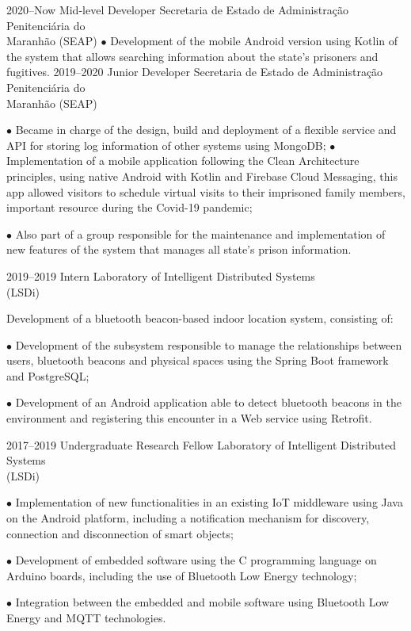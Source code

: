 \documentclass[]{../document-class/twentysecondcv}
\begin{document}
\begin{twenty}
	\twentyitem
		{2020--Now}
		{Mid-level Developer}
		{Secretaria de Estado de Administração Penitenciária do \\\hspace*{\fill}Maranhão (SEAP)}
		{$\bullet$ Development of the mobile Android version using Kotlin of the system that allows searching information about the state's prisoners and fugitives.}
	\twentyitem
		{2019--2020}
		{Junior Developer}
		{Secretaria de Estado de Administração Penitenciária do \\\hspace*{\fill}Maranhão (SEAP)}
		{$\bullet$ Became in charge of the design, build and deployment of a flexible service and API for storing log information of other systems using MongoDB;\vskip 4pt
			$\bullet$ Implementation of a mobile application following the Clean Architecture principles, using native Android with Kotlin and Firebase Cloud Messaging, this app allowed visitors to schedule virtual visits to their imprisoned family members, important resource during the Covid-19 pandemic;\vskip 4pt


		$\bullet$ Also part of a group responsible for the maintenance and implementation of new features of the system that manages all state's prison information.}
		
	\twentyitem
		{2019--2019}
		{Intern}
		{Laboratory of Intelligent Distributed Systems \\\hspace*{\fill}(LSDi)}
		{Development of a bluetooth beacon-based indoor location system, consisting of:\vskip 4pt
          
        
		$\bullet$ Development of the subsystem responsible to manage the relationships between users, bluetooth beacons and physical spaces using the Spring Boot framework and PostgreSQL;\vskip 4pt

		$\bullet$ Development of an Android application able to detect bluetooth beacons in the environment and registering this encounter in a Web service using Retrofit.}

	\twentyitem
		{2017--2019}
		{Undergraduate Research Fellow}
		{Laboratory of Intelligent Distributed Systems \\\hspace*{\fill}(LSDi)}
		{$\bullet$ Implementation of new functionalities in an existing IoT middleware using Java on the Android platform, including a notification mechanism for discovery, connection and disconnection of smart objects;\vskip 4pt 


		$\bullet$ Development of embedded software using the C programming language on Arduino boards, including the use of Bluetooth Low Energy technology;\vskip 4pt 

		$\bullet$ Integration between the embedded and mobile software using Bluetooth Low Energy and MQTT technologies.}
\end{twenty}
\end{document}
